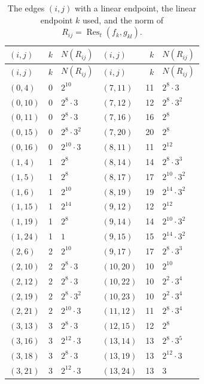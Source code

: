 \documentclass[11pt]{article}
\begin{document}
\begingroup\small
\setlength{\LTcapwidth}{\textwidth}
\begin{longtable}{@{}lrl@{\qquad}lrl@{}}
\caption{The edges $(i,j)$ with a linear endpoint, the linear endpoint $k$ used, and the norm of $R_{ij}=\operatorname{Res}_t(f_k,g_{kl})$.}\label{tab:sep}\\
\hline $(i,j)$ & $k$ & $N(R_{ij})$ & $(i,j)$ & $k$ & $N(R_{ij})$\\\hline\endfirsthead\hline $(i,j)$ & $k$ & $N(R_{ij})$ & $(i,j)$ & $k$ & $N(R_{ij})$\\\hline\endhead\hline\endfoot
$(0,4)$ & 0 & $2^{10}$ & $(7,11)$ & 11 & $2^{8}\cdot 3$\\
$(0,10)$ & 0 & $2^{8}\cdot 3$ & $(7,12)$ & 12 & $2^{8}\cdot 3^{2}$\\
$(0,11)$ & 0 & $2^{8}\cdot 3$ & $(7,16)$ & 16 & $2^{8}$\\
$(0,15)$ & 0 & $2^{8}\cdot 3^{2}$ & $(7,20)$ & 20 & $2^{8}$\\
$(0,16)$ & 0 & $2^{10}\cdot 3$ & $(8,11)$ & 11 & $2^{12}$\\
$(1,4)$ & 1 & $2^{8}$ & $(8,14)$ & 14 & $2^{8}\cdot 3^{3}$\\
$(1,5)$ & 1 & $2^{8}$ & $(8,17)$ & 17 & $2^{10}\cdot 3^{2}$\\
$(1,6)$ & 1 & $2^{10}$ & $(8,19)$ & 19 & $2^{14}\cdot 3^{2}$\\
$(1,15)$ & 1 & $2^{14}$ & $(9,12)$ & 12 & $2^{12}$\\
$(1,19)$ & 1 & $2^{8}$ & $(9,14)$ & 14 & $2^{10}\cdot 3^{2}$\\
$(1,24)$ & 1 & $1$ & $(9,15)$ & 15 & $2^{14}\cdot 3^{2}$\\
$(2,6)$ & 2 & $2^{10}$ & $(9,17)$ & 17 & $2^{8}\cdot 3^{3}$\\
$(2,10)$ & 2 & $2^{8}\cdot 3$ & $(10,20)$ & 10 & $2^{10}$\\
$(2,12)$ & 2 & $2^{8}\cdot 3$ & $(10,22)$ & 10 & $2^{2}\cdot 3^{4}$\\
$(2,19)$ & 2 & $2^{8}\cdot 3^{2}$ & $(10,23)$ & 10 & $2^{2}\cdot 3^{4}$\\
$(2,21)$ & 2 & $2^{10}\cdot 3$ & $(11,12)$ & 11 & $2^{8}\cdot 3^{4}$\\
$(3,13)$ & 3 & $2^{8}\cdot 3$ & $(12,15)$ & 12 & $2^{8}$\\
$(3,16)$ & 3 & $2^{12}\cdot 3$ & $(13,14)$ & 13 & $2^{8}\cdot 3^{5}$\\
$(3,18)$ & 3 & $2^{8}\cdot 3$ & $(13,19)$ & 13 & $2^{12}\cdot 3$\\
$(3,21)$ & 3 & $2^{12}\cdot 3$ & $(13,24)$ & 13 & $3$\\

\end{longtable}
\end{document}
